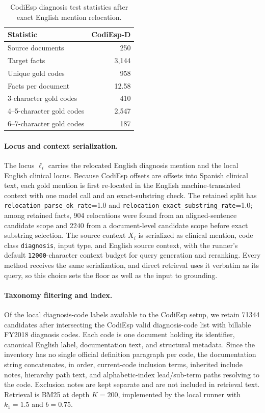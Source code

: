 \begin{table}[!htbp]
\centering
\small
\begin{tabular}{@{}lr@{}}
\toprule
\textbf{Statistic} & \textbf{CodiEsp-D} \\
\midrule
Source documents & 250 \\
Target facts & 3,144 \\
Unique gold codes & 958 \\
Facts per document & 12.58 \\
3-character gold codes & 410 \\
4--5-character gold codes & 2,547 \\
6--7-character gold codes & 187 \\
\bottomrule
\end{tabular}
\caption{CodiEsp diagnosis test statistics after exact English mention
relocation.}
\label{tab:codiesp_data_stats}
\end{table}

\paragraph{Locus and context serialization.}
The locus $\ell_i$ carries the relocated English diagnosis mention and the
local English clinical locus. Because CodiEsp offsets are offsets into Spanish
clinical text, each gold mention is first re-located in the English
machine-translated context with one model call and an exact-substring check.
The retained split has \texttt{relocation\_parse\_ok\_rate}=1.0 and
\texttt{relocation\_exact\_substring\_rate}=1.0; among retained facts,
\num{904} relocations were found from an aligned-sentence candidate scope and
\num{2240} from a document-level candidate scope before exact substring
selection. The source context $X_i$ is serialized as clinical mention, code
class \texttt{diagnosis}, input type, and English source context, with the
runner's default \texttt{12000}-character context budget for query generation
and reranking. Every method receives the same serialization, and direct
retrieval uses it verbatim as its query, so this choice sets the floor as well
as the input to grounding.

\paragraph{Taxonomy filtering and index.}
Of the local diagnosis-code labels available to the CodiEsp setup, we retain
\num{71344} candidates after intersecting the CodiEsp valid diagnosis-code list
with billable FY2018 diagnosis codes. Each code is one document holding its
identifier, canonical English label, documentation text, and structural
metadata. Since the inventory has no single official definition paragraph per
code, the documentation string concatenates, in order, current-code inclusion
terms, inherited include notes, hierarchy path text, and alphabetic-index
lead/sub-term paths resolving to the code. Exclusion notes are kept separate
and are not included in retrieval text. Retrieval is BM25 at depth $K{=}200$,
implemented by the local runner with $k_1=1.5$ and $b=0.75$.

